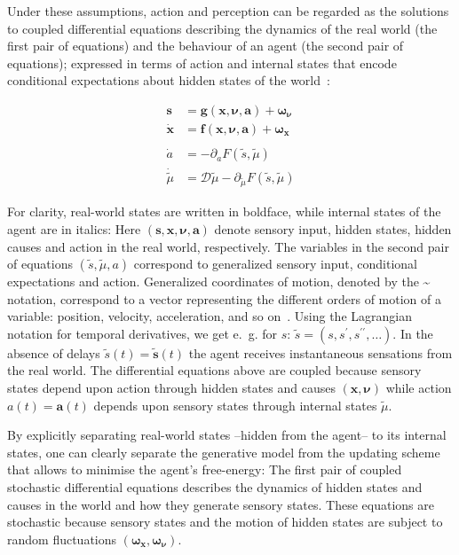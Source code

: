 \documentclass[a4paper]{article} %
\begin{document}
Under these assumptions, action and perception can be regarded as the
solutions to coupled differential equations describing the dynamics of
the real world (the first pair of equations) and the behaviour of an
agent (the second pair of equations); expressed in terms of action and
internal states that encode conditional expectations about hidden states
of the world~\citep{Friston10a}:

\begin{align}
\bm{s} &= \bm{g(x, \nu, a) + \omega_\nu} \nonumber \\%
\bm{\dot{x}} &= \bm{f(x, \nu, a) + \omega_x}  \nonumber  \\%
  \label{eq:1} \\%
\dot{a} &= -\partial_a F(\tilde{s}, \tilde{\mu}) \nonumber   \\%
\dot{\tilde{\mu}} &= \mathcal{D} \tilde{\mu} - \partial_{\tilde{\mu}} F(\tilde{s}, \tilde{\mu})  \nonumber  %
\end{align}%

For clarity, real-world states are written in boldface, while internal states of the agent are in italics: Here $\bm{(s, x, \nu, a)}$ denote sensory input, hidden states, hidden causes and action in the real world, respectively. The variables in the second pair of equations $(\tilde{s}, \tilde{\mu}, a)$ correspond to generalized sensory input, conditional expectations and action. %
Generalized coordinates of motion, denoted by the \textasciitilde{} notation, correspond to a vector representing the different orders of motion of a variable: position, velocity, acceleration, and so on~\citep{Friston10d}. Using the Lagrangian notation for temporal derivatives, we get e.~g. for $s$: $\tilde{s} = (s, s^{\prime}, s^{\prime\prime}, \ldots)$. %
In the absence of delays $\tilde{s}(t) = \bm{\tilde{s}}(t)$ the agent receives instantaneous sensations from the real world. The differential equations above are coupled because sensory states depend upon action through hidden states and causes $\bm{(x, \nu)}$ while action $a(t) = \bm{a}(t)$ depends upon sensory states through internal states $\tilde{\mu}$.

By explicitly separating real-world states --hidden from the agent-- to its internal states,  one can clearly separate the generative model from the updating scheme that allows to minimise the agent's free-energy: The first pair of coupled stochastic differential equations describes the dynamics of hidden states and causes in the world and how they generate sensory states. These equations are stochastic because sensory states and the motion of hidden states are subject to random fluctuations $(\bm{\omega_x, \omega_\nu})$. 
\end{document}
